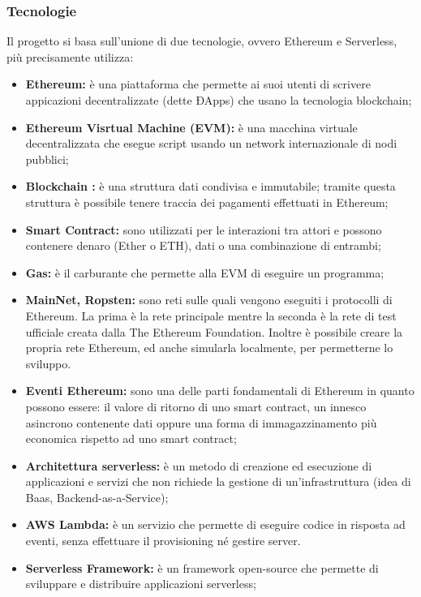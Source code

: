     \subsubsection{Tecnologie}
     Il progetto si basa sull'unione di due tecnologie, ovvero Ethereum e Serverless, più precisamente utilizza:
     \begin{itemize}
    		\item \textbf{Ethereum: }è una piattaforma che permette ai suoi utenti di scrivere appicazioni decentralizzate (dette ÐApps) che usano la tecnologia blockchain;
    		\item \textbf{Ethereum Visrtual Machine (EVM): }è una macchina virtuale decentralizzata che esegue script usando un network internazionale di nodi pubblici;
    		\item \textbf{Blockchain : }è una struttura dati condivisa e immutabile;  tramite questa struttura è possibile tenere traccia dei pagamenti effettuati in Ethereum;
    		\item \textbf{Smart Contract: }sono utilizzati per le interazioni tra attori e possono contenere denaro (Ether o ETH), dati o una combinazione di entrambi;
    		\item \textbf{Gas: }è il carburante che permette alla EVM di eseguire un programma;
    		 \item \textbf{MainNet, Ropsten: }sono reti sulle quali vengono eseguiti i protocolli di Ethereum. La prima è la rete principale mentre la seconda è la rete di test ufficiale creata dalla The Ethereum Foundation. Inoltre è possibile creare la propria rete Ethereum, ed anche simularla localmente, per permetterne lo sviluppo.
    		 \item \textbf{Eventi Ethereum: }sono una delle parti fondamentali di Ethereum in quanto possono essere: il  valore di ritorno di uno smart contract,  un innesco asincrono contenente dati oppure una forma di  immagazzinamento più economica rispetto ad uno smart contract;
    		 \item \textbf{Architettura serverless: }è un metodo di creazione ed esecuzione di applicazioni e servizi che non richiede la gestione di un'infrastruttura (idea di Baas, Backend-as-a-Service);
    		 \item \textbf{AWS Lambda: }è un servizio che permette di eseguire codice  in risposta ad eventi, senza effettuare il provisioning né gestire server.
    		 \item \textbf{Serverless Framework: }è un framework open-source che permette di sviluppare e distribuire applicazioni serverless;

\end{itemize}
